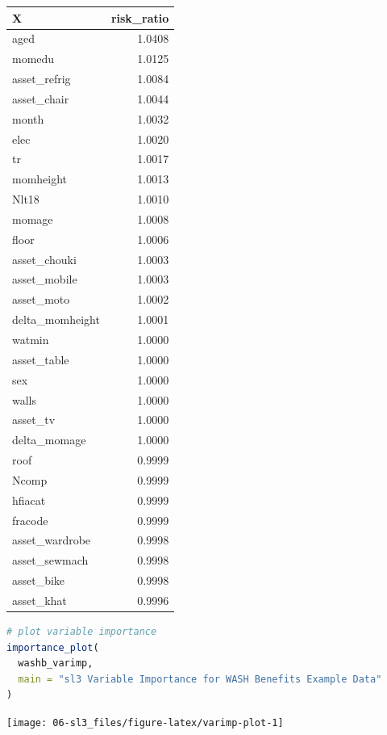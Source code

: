 \documentclass[
  12pt, krantz2,
]{krantz}
\theoremstyle{definition}
\theoremstyle{definition}
\theoremstyle{definition}
\newcommand{\1}{\mathbbm{1}}
\begin{document}
\begin{table}
\centering
\begin{tabular}{l|r}
\hline
X & risk\_ratio\\
\hline
aged & 1.0408\\
\hline
momedu & 1.0125\\
\hline
asset\_refrig & 1.0084\\
\hline
asset\_chair & 1.0044\\
\hline
month & 1.0032\\
\hline
elec & 1.0020\\
\hline
tr & 1.0017\\
\hline
momheight & 1.0013\\
\hline
Nlt18 & 1.0010\\
\hline
momage & 1.0008\\
\hline
floor & 1.0006\\
\hline
asset\_chouki & 1.0003\\
\hline
asset\_mobile & 1.0003\\
\hline
asset\_moto & 1.0002\\
\hline
delta\_momheight & 1.0001\\
\hline
watmin & 1.0000\\
\hline
asset\_table & 1.0000\\
\hline
sex & 1.0000\\
\hline
walls & 1.0000\\
\hline
asset\_tv & 1.0000\\
\hline
delta\_momage & 1.0000\\
\hline
roof & 0.9999\\
\hline
Ncomp & 0.9999\\
\hline
hfiacat & 0.9999\\
\hline
fracode & 0.9999\\
\hline
asset\_wardrobe & 0.9998\\
\hline
asset\_sewmach & 0.9998\\
\hline
asset\_bike & 0.9998\\
\hline
asset\_khat & 0.9996\\
\hline
\end{tabular}
\end{table}

\begin{lstlisting}[language=R]
# plot variable importance
importance_plot(
  washb_varimp,
  main = "sl3 Variable Importance for WASH Benefits Example Data"
)
\end{lstlisting}

\begin{center}\texttt{[image: 06-sl3\_files/figure-latex/varimp-plot-1]} \end{center}
\end{document}
